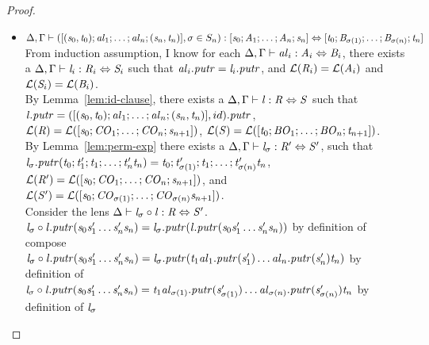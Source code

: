 \begin{lemma}
\begin{proof}
\begin{itemize}
\item$\Delta, \Gamma \vdash ([(\mathit{s}_0,\mathit{t}_0);\mathit{al}_1;\ldots;\mathit{al}_n;(\mathit{s}_n,\mathit{t}_n)],\sigma \in S_n) : [\mathit{s}_0 ; \mathit{A}_1 ; \ldots ; \mathit{A}_n ; \mathit{s}_n] \Leftrightarrow [\mathit{t}_0; \mathit{B}_{\sigma(1)} ; \ldots ; \mathit{B}_{\sigma(n)} ; \mathit{t}_n]$\\
From induction assumption, I know for each $\Delta, \Gamma \vdash \mathit{al}_i : \mathit{A}_i \Leftrightarrow \mathit{B}_i$, there exists a $\Delta, \Gamma \vdash \mathit{l}_i : \mathit{R}_i \Leftrightarrow \mathit{S}_i$ such that $\mathit{al}_i.\mathit{putr}=\mathit{l}_i.\mathit{putr}$,
and $\mathcal{L}(\mathit{R}_i)=\mathcal{L}(\mathit{A}_i)$ and $\mathcal{L}(\mathit{S}_i)=\mathcal{L}(\mathit{B}_i)$.\\
By Lemma~\ref{lem:id-clause}, there exists a $\Delta, \Gamma \vdash \mathit{l} : \mathit{R} \Leftrightarrow \mathit{S}$ such that $\mathit{l}.\mathit{putr}=([(\mathit{s}_0,\mathit{t}_0);\mathit{al}_1;\ldots;\mathit{al}_n;(\mathit{s}_n,\mathit{t}_n)],id).\mathit{putr}$,
$\mathcal{L}(\mathit{R})=\mathcal{L}([\mathit{s}_0;\mathit{CO}_1;\ldots;\mathit{CO}_n;\mathit{s}_{n+1}])$,
$\mathcal{L}(\mathit{S})=\mathcal{L}([\mathit{t}_0;\mathit{BO}_1;\ldots;\mathit{BO}_n;\mathit{t}_{n+1}])$.\\
By Lemma~\ref{lem:perm-exp} there exists a $\Delta, \Gamma \vdash \mathit{l}_{\sigma} : \mathit{R}' \Leftrightarrow \mathit{S}'$,
such that $\mathit{l}_{\sigma}.\mathit{putr}(\mathit{t}_0;\mathit{t}_1';\mathit{t}_1;\ldots;\mathit{t}_n'\mathit{t}_n)=\mathit{t}_0;\mathit{t}_{\sigma(1)}';\mathit{t}_1;\ldots;\mathit{t}_{\sigma(n)}'\mathit{t}_n$,
$\mathcal{L}(\mathit{R}')=\mathcal{L}([\mathit{s}_0;\mathit{CO}_1;\ldots;\mathit{CO}_n;\mathit{s}_{n+1}])$, and
$\mathcal{L}(\mathit{S}')=\mathcal{L}([\mathit{s}_0;\mathit{CO}_{\sigma(1)};\ldots;\mathit{CO}_{\sigma(n)}\mathit{s}_{n+1}])$.\\
Consider the lens $\Delta \vdash \mathit{l}_{\sigma} \circ \mathit{l} : \mathit{R} \Leftrightarrow \mathit{S}'$.\\
$\mathit{l}_{\sigma} \circ \mathit{l}.\mathit{putr}(\mathit{s}_0\mathit{s}_1'\ldots\mathit{s}_n'\mathit{s}_n)=\mathit{l}_{\sigma}.\mathit{putr}(\mathit{l}.\mathit{putr}(\mathit{s}_0\mathit{s}_1'\ldots\mathit{s}_n'\mathit{s}_n))$ by definition of compose\\
$\mathit{l}_{\sigma} \circ \mathit{l}.\mathit{putr}(\mathit{s}_0\mathit{s}_1'\ldots\mathit{s}_n'\mathit{s}_n)=\mathit{l}_{\sigma}.\mathit{putr}(\mathit{t}_1\mathit{al}_1.\mathit{putr}(\mathit{s}_1')\ldots\mathit{al}_n.\mathit{putr}(\mathit{s}_n')\mathit{t}_n)$ by definition of \Lens{}\\
$\mathit{l}_{\sigma} \circ \mathit{l}.\mathit{putr}(\mathit{s}_0\mathit{s}_1'\ldots\mathit{s}_n'\mathit{s}_n)=\mathit{t}_1\mathit{al}_{\sigma(1)}.\mathit{putr}(\mathit{s}_{\sigma(1)}')\ldots\mathit{al}_{\sigma(n)}.\mathit{putr}(\mathit{s}_{\sigma(n)}')\mathit{t}_n$ by definition of $\mathit{l}_{\sigma}$\\

\end{itemize}
\end{proof}
\end{lemma}

